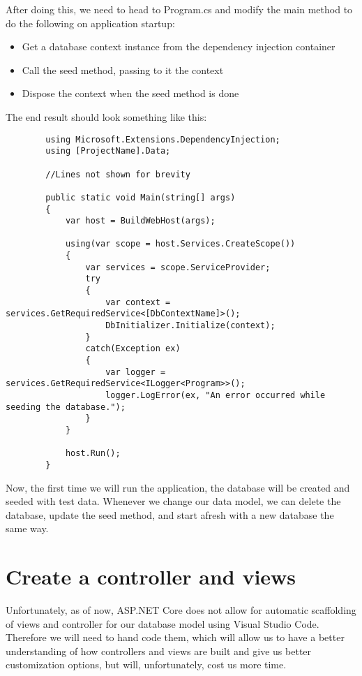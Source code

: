\documentclass{report}
\begin{document}
    After doing this, we need to head to Program.cs and modify the main
    method to do the following on application startup:
    \begin{itemize}
        \item Get a database context instance from the dependency injection
        container
        \item Call the seed method, passing to it the context
        \item Dispose the context when the seed method is done
    \end{itemize}

    The end result should look something like this:
    \lstset{style=sharpc}
    \begin{lstlisting}
        using Microsoft.Extensions.DependencyInjection;
        using [ProjectName].Data;
        
        //Lines not shown for brevity

        public static void Main(string[] args)
        {
            var host = BuildWebHost(args);

            using(var scope = host.Services.CreateScope())
            {
                var services = scope.ServiceProvider;
                try
                {
                    var context = services.GetRequiredService<[DbContextName]>();
                    DbInitializer.Initialize(context);
                }
                catch(Exception ex)
                {
                    var logger = services.GetRequiredService<ILogger<Program>>();
                    logger.LogError(ex, "An error occurred while seeding the database.");
                }
            }

            host.Run();
        }
    \end{lstlisting}

    Now, the first time we will run the application, the database will be created and seeded with
    test data. Whenever we change our data model, we can delete the database, update the seed method,
    and start afresh with a new database the same way.

    \chapter{Create a controller and views}
    Unfortunately, as of now, ASP.NET Core does not allow for automatic
    scaffolding of views and controller for our database model using Visual Studio
    Code. Therefore we will need to hand code them, which will allow us to have
    a better understanding of how controllers and views are built and give us better
    customization options, but will, unfortunately, cost us more time.
\end{document}
